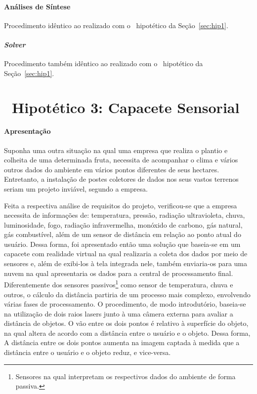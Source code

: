          
       
      \paragraph{Análises de Síntese}
         Procedimento idêntico ao realizado com o \wearable\ hipotético da Seção~\ref{sec:hip1}.
         
         
      \paragraph{\textit{Solver}}
         Procedimento também idêntico ao realizado com o \wearable\ hipotético da Seção~\ref{sec:hip1}.
      
      
      
   \section{\Wearable\ Hipotético 3: Capacete Sensorial} \label{sec:hip3}

      \paragraph{Apresentação}
         Suponha uma outra situação na qual uma empresa que realiza o plantio e colheita de uma determinada fruta, necessita de acompanhar o clima e vários outros dados do ambiente em vários pontos diferentes de seus hectares.
         Entretanto, a instalação de postes coletores de dados nos seus vastos terrenos seriam um projeto inviável, segundo a empresa.
         
         
         Feita a respectiva análise de requisitos do projeto, verificou-se que a empresa necessita de informações de: temperatura, pressão, radiação ultravioleta, chuva, luminosidade, fogo, radiação infravermelha, monóxido de carbono, gás natural, gás combustível, além de um sensor de distância em relação ao ponto atual do usuário.
         Dessa forma, foi apresentado então uma solução que baseia-se em um capacete com realidade virtual na qual realizaria a coleta dos dados por meio de sensores e, além de exibi-los à tela integrada nele, também enviaria-os para uma nuvem na qual apresentaria os dados para a central de processamento final.
         Diferentemente dos sensores passivos\footnote{Sensores na qual interpretam os respectivos dados do ambiente de forma passiva.} como sensor de temperatura, chuva e outros, o cálculo da distância partiria de um processo mais complexo, envolvendo várias fases de processamento.
         O procedimento, de modo introdutório, baseia-se na utilização de dois raios lasers junto à uma câmera externa para avaliar a distância de objetos.
         O vão entre os dois pontos é relativo à superfície do objeto, na qual altera de acordo com a distância entre o usuário e o objeto.
         Dessa forma, A distância entre os dois pontos aumenta na imagem captada à medida que a distância entre o usuário e o objeto reduz, e vice-versa.

